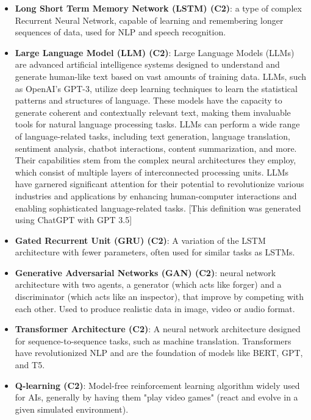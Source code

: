 \documentclass{article}
\begin{document}
\begin{itemize}
    \item \textbf{Long Short Term Memory Network (LSTM) (C2)}: a type of complex Recurrent Neural Network, capable of learning and remembering longer sequences of data, used for NLP and speech recognition.
    
    \item \textbf{Large Language Model (LLM) (C2)}: Large Language Models (LLMs) are advanced artificial intelligence systems designed to understand and generate human-like text based on vast amounts of training data. LLMs, such as OpenAI's GPT-3, utilize deep learning techniques to learn the statistical patterns and structures of language. These models have the capacity to generate coherent and contextually relevant text, making them invaluable tools for natural language processing tasks. LLMs can perform a wide range of language-related tasks, including text generation, language translation, sentiment analysis, chatbot interactions, content summarization, and more. Their capabilities stem from the complex neural architectures they employ, which consist of multiple layers of interconnected processing units. LLMs have garnered significant attention for their potential to revolutionize various industries and applications by enhancing human-computer interactions and enabling sophisticated language-related tasks. [This definition was generated using ChatGPT with GPT 3.5]

    \item \textbf{Gated Recurrent Unit (GRU) (C2)}: A variation of the LSTM architecture with fewer parameters, often used for similar tasks as LSTMs.

    \item \textbf{Generative Adversarial Networks (GAN) (C2)}: neural network architecture with two agents, a generator (which acts like forger) and a discriminator (which acts like an inspector), that improve by competing with each other. Used to produce realistic data in image, video or audio format.

    \item \textbf{Transformer Architecture (C2)}: A neural network architecture designed for sequence-to-sequence tasks, such as machine translation. Transformers have revolutionized NLP and are the foundation of models like BERT, GPT, and T5.
    
    \item \textbf{Q-learning (C2)}: Model-free reinforcement learning algorithm widely used for AIs, generally by having them "play video games" (react and evolve in a given simulated environment).
\end{itemize}
\end{document}
